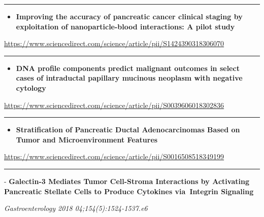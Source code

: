 \documentclass[]{article}
\providecommand{\tightlist}{%
  \setlength{\itemsep}{0pt}\setlength{\parskip}{0pt}}
\begin{document}
\begin{center}\rule{0.5\linewidth}{\linethickness}\end{center}

\begin{itemize}
\tightlist
\item
  \textbf{Improving the accuracy of pancreatic cancer clinical staging
  by exploitation of nanoparticle-blood interactions: A pilot study}
\end{itemize}

\url{https://www.sciencedirect.com/science/article/pii/S1424390318306070}

\begin{center}\rule{0.5\linewidth}{\linethickness}\end{center}

\begin{itemize}
\tightlist
\item
  \textbf{DNA profile components predict malignant outcomes in select
  cases of intraductal papillary mucinous neoplasm with negative
  cytology}
\end{itemize}

\url{https://www.sciencedirect.com/science/article/pii/S0039606018302836}

\begin{center}\rule{0.5\linewidth}{\linethickness}\end{center}

\begin{itemize}
\tightlist
\item
  \textbf{Stratification of Pancreatic Ductal Adenocarcinomas Based on
  Tumor and Microenvironment Features}
\end{itemize}

\url{https://www.sciencedirect.com/science/article/pii/S0016508518349199}

\begin{center}\rule{0.5\linewidth}{\linethickness}\end{center}

 - \textbf{Galectin-3 Mediates Tumor Cell-Stroma Interactions by
Activating Pancreatic Stellate Cells to Produce Cytokines via~Integrin
Signaling}

\emph{Gastroenterology 2018 04;154(5):1524-1537.e6}
\end{document}
